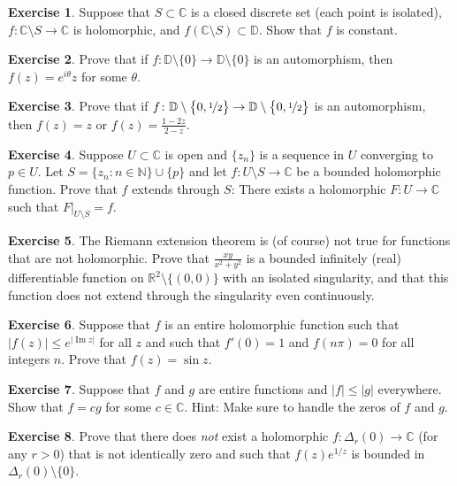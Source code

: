 \documentclass[12pt,openany]{book}
\renewcommand{\Im}{\operatorname{Im}}
\newcommand{\sabs}[1]{\lvert {#1} \rvert}
\newcommand{\C}{{\mathbb{C}}}
\newcommand{\R}{{\mathbb{R}}}
\newcommand{\N}{{\mathbb{N}}}
\newcommand{\D}{{\mathbb{D}}}
\theoremstyle{plain}
\theoremstyle{remark}
\theoremstyle{definition}
\newenvironment{exbox}{%
    \def\FrameCommand{\vrule width 1pt \relax\hspace{10pt}}%
    \MakeFramed{\advance\hsize-\width\FrameRestore}%
}{%
    \endMakeFramed
}
\theoremstyle{exercise}
\newtheorem{exercise}{Exercise}[section]
\theoremstyle{example}
\begin{document}
\begin{exbox}
\begin{exercise}
Suppose that $S \subset \C$ is a closed discrete set (each point is isolated),
$f \colon \C \setminus S \to \C$ is holomorphic,
and $f(\C \setminus S) \subset \D$.
Show that $f$ is constant.
\end{exercise}

\begin{exercise}
Prove that if $f \colon \D \setminus \{ 0 \} \to \D \setminus \{ 0 \}$
is an automorphism, then $f(z) = e^{i\theta} z$ for some $\theta$.
\end{exercise}

\begin{exercise}
Prove that if
$f \colon \D \setminus \bigl\{ 0, \nicefrac{1}{2} \bigr\} \to \D \setminus
\bigl\{ 0 , \nicefrac{1}{2} \bigr\}$
is an automorphism, then $f(z) = z$ or $f(z) = \frac{1-2z}{2-z}$.
\end{exercise}

\begin{exercise}
Suppose $U \subset \C$ is open and
$\{ z_n \}$ is a sequence in $U$ converging to $p \in U$.
Let $S = \{ z_n : n \in \N \} \cup \{ p \}$ and let
$f \colon U \setminus S \to \C$ be a bounded holomorphic function.
Prove that $f$ extends through $S$:  There exists a holomorphic
$F \colon U \to \C$ such that $F|_{U \setminus S} = f$.
\end{exercise}

\begin{exercise}
The Riemann extension theorem is (of course) not true for functions that are
not holomorphic.  Prove that $\frac{xy}{x^2+y^2}$ is a bounded infinitely 
(real) differentiable function
on $\R^2 \setminus \{ (0,0) \}$ with an isolated singularity, and that this
function does not
extend through the singularity even continuously.
\end{exercise}

\begin{exercise}
Suppose that $f$ is an entire holomorphic function such that
$\sabs{f(z)} \leq e^{\sabs{\Im z}}$ for all $z$ and such that
$f'(0) =1$ and $f(n\pi) = 0$ for all integers $n$.
Prove that $f(z) = \sin z$.
\end{exercise}

\begin{exercise}
Suppose that $f$ and $g$ are entire functions and $\sabs{f} \leq \sabs{g}$
everywhere.  Show that $f = c g$ for some $c \in \C$.
Hint: Make sure to handle the zeros of $f$ and $g$.
\end{exercise}

\begin{exercise}
Prove that there does \emph{not} exist a holomorphic
$f \colon \Delta_r(0) \to \C$ (for any $r > 0$)
that is not identically zero and
such that
$f(z) e^{1/z}$ is bounded in $\Delta_r(0) \setminus \{ 0 \}$.
\end{exercise}
\end{exbox}
\end{document}
